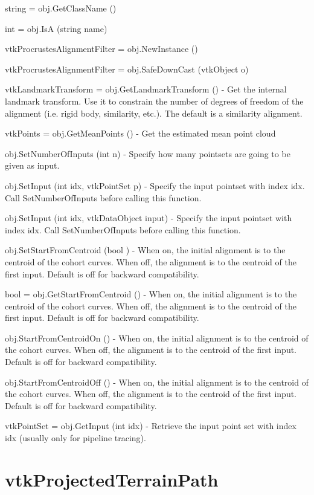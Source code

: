 \begin{DoxyItemize}
\item {\ttfamily string = obj.\-Get\-Class\-Name ()}  
\item {\ttfamily int = obj.\-Is\-A (string name)}  
\item {\ttfamily vtk\-Procrustes\-Alignment\-Filter = obj.\-New\-Instance ()}  
\item {\ttfamily vtk\-Procrustes\-Alignment\-Filter = obj.\-Safe\-Down\-Cast (vtk\-Object o)}  
\item {\ttfamily vtk\-Landmark\-Transform = obj.\-Get\-Landmark\-Transform ()} -\/ Get the internal landmark transform. Use it to constrain the number of degrees of freedom of the alignment (i.\-e. rigid body, similarity, etc.). The default is a similarity alignment.  
\item {\ttfamily vtk\-Points = obj.\-Get\-Mean\-Points ()} -\/ Get the estimated mean point cloud  
\item {\ttfamily obj.\-Set\-Number\-Of\-Inputs (int n)} -\/ Specify how many pointsets are going to be given as input.  
\item {\ttfamily obj.\-Set\-Input (int idx, vtk\-Point\-Set p)} -\/ Specify the input pointset with index idx. Call Set\-Number\-Of\-Inputs before calling this function.  
\item {\ttfamily obj.\-Set\-Input (int idx, vtk\-Data\-Object input)} -\/ Specify the input pointset with index idx. Call Set\-Number\-Of\-Inputs before calling this function.  
\item {\ttfamily obj.\-Set\-Start\-From\-Centroid (bool )} -\/ When on, the initial alignment is to the centroid of the cohort curves. When off, the alignment is to the centroid of the first input. Default is off for backward compatibility.  
\item {\ttfamily bool = obj.\-Get\-Start\-From\-Centroid ()} -\/ When on, the initial alignment is to the centroid of the cohort curves. When off, the alignment is to the centroid of the first input. Default is off for backward compatibility.  
\item {\ttfamily obj.\-Start\-From\-Centroid\-On ()} -\/ When on, the initial alignment is to the centroid of the cohort curves. When off, the alignment is to the centroid of the first input. Default is off for backward compatibility.  
\item {\ttfamily obj.\-Start\-From\-Centroid\-Off ()} -\/ When on, the initial alignment is to the centroid of the cohort curves. When off, the alignment is to the centroid of the first input. Default is off for backward compatibility.  
\item {\ttfamily vtk\-Point\-Set = obj.\-Get\-Input (int idx)} -\/ Retrieve the input point set with index idx (usually only for pipeline tracing).  
\end{DoxyItemize}\hypertarget{vtkhybrid_vtkprojectedterrainpath}{}\section{vtk\-Projected\-Terrain\-Path}\label{vtkhybrid_vtkprojectedterrainpath}
